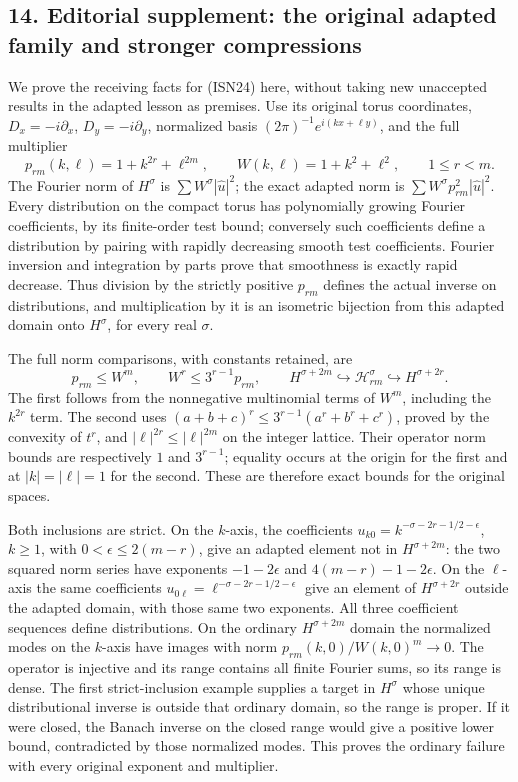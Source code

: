 \documentclass[
  11pt,
]{article}
\begin{document}
\subsection{14. Editorial supplement: the original adapted family and
stronger
compressions}\label{editorial-supplement-the-original-adapted-family-and-stronger-compressions}

We prove the receiving facts for (ISN24) here, without taking new
unaccepted results in the adapted lesson as premises. Use its original
torus coordinates, \(D_x=-i\partial_x\), \(D_y=-i\partial_y\),
normalized basis \((2\pi)^{-1}e^{i(kx+\ell y)}\), and the full
multiplier \[
 p_{rm}(k,\ell)=1+k^{2r}+\ell^{2m},\qquad
 W(k,\ell)=1+k^2+\ell^2,\qquad 1\leq r<m.
\tag{IA1}
\] The Fourier norm of \(H^\sigma\) is \(\sum W^\sigma|\widehat u|^2\);
the exact adapted norm is \(\sum W^\sigma p_{rm}^2|\widehat u|^2\).
Every distribution on the compact torus has polynomially growing Fourier
coefficients, by its finite-order test bound; conversely such
coefficients define a distribution by pairing with rapidly decreasing
smooth test coefficients. Fourier inversion and integration by parts
prove that smoothness is exactly rapid decrease. Thus division by the
strictly positive \(p_{rm}\) defines the actual inverse on
distributions, and multiplication by it is an isometric bijection from
this adapted domain onto \(H^\sigma\), for every real \(\sigma\).

The full norm comparisons, with constants retained, are \[
 p_{rm}\leq W^m,\qquad W^r\leq3^{r-1}p_{rm},
 \qquad
 H^{\sigma+2m}\hookrightarrow\mathcal H^\sigma_{rm}
                \hookrightarrow H^{\sigma+2r}.
\tag{IA2}
\] The first follows from the nonnegative multinomial terms of \(W^m\),
including the \(k^{2r}\) term. The second uses
\((a+b+c)^r\leq3^{r-1}(a^r+b^r+c^r)\), proved by the convexity of
\(t^r\), and \(|\ell|^{2r}\leq|\ell|^{2m}\) on the integer lattice.
Their operator norm bounds are respectively \(1\) and \(3^{r-1}\);
equality occurs at the origin for the first and at \(|k|=|\ell|=1\) for
the second. These are therefore exact bounds for the original spaces.

Both inclusions are strict. On the \(k\)-axis, the coefficients
\(u_{k0}=k^{-\sigma-2r-1/2-\epsilon}\), \(k\geq1\), with
\(0<\epsilon\leq2(m-r)\), give an adapted element not in
\(H^{\sigma+2m}\): the two squared norm series have exponents
\(-1-2\epsilon\) and \(4(m-r)-1-2\epsilon\). On the \(\ell\)-axis the
same coefficients \(u_{0\ell}=\ell^{-\sigma-2r-1/2-\epsilon}\) give an
element of \(H^{\sigma+2r}\) outside the adapted domain, with those same
two exponents. All three coefficient sequences define distributions. On
the ordinary \(H^{\sigma+2m}\) domain the normalized modes on the
\(k\)-axis have images with norm \(p_{rm}(k,0)/W(k,0)^m\to0\). The
operator is injective and its range contains all finite Fourier sums, so
its range is dense. The first strict-inclusion example supplies a target
in \(H^\sigma\) whose unique distributional inverse is outside that
ordinary domain, so the range is proper. If it were closed, the Banach
inverse on the closed range would give a positive lower bound,
contradicted by those normalized modes. This proves the ordinary failure
with every original exponent and multiplier.
\end{document}
